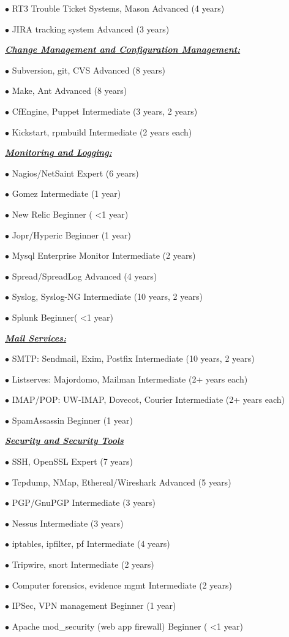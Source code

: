 \documentclass{article}
\newcommand{\skillset}[1]{{ \underline{\textbf{\emph{#1}}}\\  }}
\newcommand{\skill}[2]{{$\bullet$ #1 \hfill #2 }}
\begin{document}
\skill{RT3 Trouble Ticket Systems, Mason}{Advanced (4 years)}

\skill{JIRA tracking system}{Advanced (3 years)}



\skillset{Change Management and Configuration Management: }

\skill{Subversion, git, CVS}{Advanced (8 years)}

\skill{Make, Ant}{Advanced (8 years)}

\skill{CfEngine, Puppet}{Intermediate (3 years, 2 years)}

\skill{Kickstart, rpmbuild}{Intermediate (2 years each)}



\skillset{Monitoring and Logging: }

\skill{Nagios/NetSaint}{Expert (6 years)}

\skill{Gomez}{Intermediate (1 year)}

\skill{New Relic}{Beginner ( \textless 1 year)}

\skill{Jopr/Hyperic}{Beginner (1 year)}

\skill{Mysql Enterprise Monitor}{Intermediate (2 years)}

\skill{Spread/SpreadLog}{Advanced (4 years)}

\skill{Syslog, Syslog-NG}{Intermediate (10 years, 2 years)}

\skill{Splunk}{Beginner( \textless 1 year)}



\skillset{Mail Services:}

\skill{SMTP: Sendmail, Exim, Postfix}{Intermediate (10 years, 2 years)}

\skill{Listserves: Majordomo, Mailman}{Intermediate (2+ years each)}

\skill{IMAP/POP: UW-IMAP, Dovecot, Courier}{Intermediate (2+ years each)}

\skill{SpamAssassin}{Beginner (1 year)}


\skillset{Security and Security Tools}

\skill{SSH, OpenSSL}{Expert (7 years)}

\skill{Tcpdump, NMap, Ethereal/Wireshark}{Advanced (5 years)}

\skill{PGP/GnuPGP}{Intermediate (3 years)}

\skill{Nessus}{Intermediate (3 years)}

\skill{iptables, ipfilter, pf}{Intermediate (4 years)}

\skill{Tripwire, snort}{Intermediate (2 years)}

\skill{Computer forensics, evidence mgmt}{Intermediate (2 years)}

\skill{IPSec, VPN management}{Beginner (1 year)}

\skill{Apache mod\_security (web app firewall)}{Beginner ( \textless 1 year)}
\end{document}
